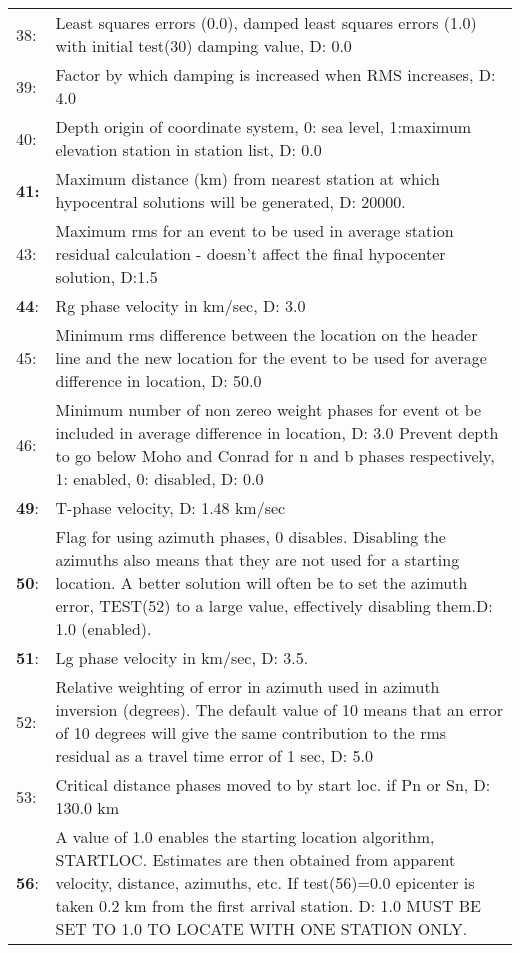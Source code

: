 \begin{longtable}{lp{14.5cm}}
38: &  Least squares errors (0.0), dam\index{Fixing depth}\index{Bisquare weighting}ped least squares errors (1.0) with initial test(30) damping value, D: 0.0 \\
39: &  	Factor by which damping is increased when RMS increases, D: 4.0 \\
40: &  	Depth origin of coordinate system, 0: sea level, 1:maximum elevation station in station list, D: 0.0 \\
\textbf{41:} &  Maximum distance (km) from nearest station at which hypocentral solutions will be generated, D: 20000.\index{Location, max distance} \\
43: &  	Maximum rms for an event to be used in \index{Average station residual }average station residual calculation - doesn't affect the final hypocenter solution, D:1.5 \\
\textbf{44}: & 	\index{Rg phase velocity}Rg phase velocity in km/sec, D: 3.0 \\
45: &  	Minimum rms difference between the location on the header line and the new location for the  event to be used for average difference in location, D: 50.0 \\
46: &  	Minimum number of non zereo weight phases for event ot be included in average difference in  location, D: 3.0 Prevent depth to go below Moho\index{Moho}\index{Conrad interface} and Conrad for n and b phases respectively, 1: enabled, 0: disabled, D: 0.0 \\
\textbf{49}: &  	T-phase velocity, D: 1.48 km/sec\index{T-phase} \\
\textbf{50}: &  Flag for \index{Using azimuth phases}using azimuth phases, 0 disables. Disabling the azimuths also means that they are not used for a starting location. A better solution will often be to set the \index{Azimuth error}azimuth error, TEST(52) to a large value, effectively disabling them.D: 1.0 (enabled). \\
\textbf{51}: &  	\index{Lg phase velocity}Lg phase velocity in km/sec, D: 3.5. \\
52: &  	Relative \index{Weight}weighting of error in azimuth used in azimuth inversion (degrees). The default value of 10 means that an error of 10 degrees will give the same contribution to the rms residual as a travel time error of 1 sec, D: 5.0 \\
53: &  	Critical distance phases moved to by start loc. if Pn or Sn, D: 130.0 km \\
\textbf{56}: &  A value of 1.0 enables the \index{Starting location}starting location algorithm, STARTLOC. Estimates are then obtained from apparent velocity, distance, azimuths, etc. If test(56)=0.0 epicenter is taken 0.2 km from the first arrival station. D: 1.0 MUST BE SET TO 1.0 TO LOCATE WITH ONE STATION ONLY. \\

\end{longtable}

